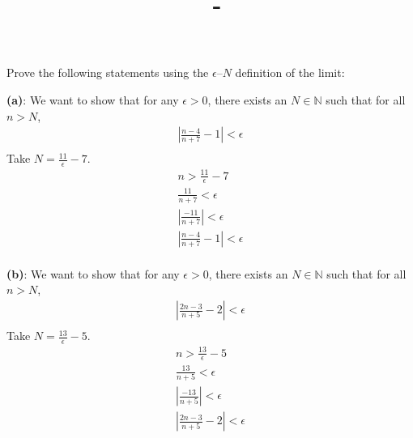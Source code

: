 \documentclass[answers,12pt,addpoints]{exam}
\author{\name}
\title{\course \ - \assignment}
\begin{document}
\maketitle
\begin{questions}
    \question Prove the following statements using the $\epsilon$–$N$ definition of the limit:
\begin{solution}
    \textbf{(a)}: We want to show that for any $\epsilon > 0$, there exists an $N \in \mathbb{N}$ such that for all $n > N$, 
    \begin{align*}
        \left| \frac{n-4}{n+7} - 1 \right| < \epsilon\\
    \end{align*}
    Take $N = \frac{11}{\epsilon} - 7$.\\
    \begin{align*}
        n > \frac{11}{\epsilon} - 7\\
        \frac{11}{n+7} < \epsilon\\
        \left| \frac{-11}{n+7} \right| < \epsilon\\
        \left| \frac{n-4}{n+7} - 1 \right| < \epsilon\\
    \end{align*}
    
    \textbf{(b)}: We want to show that for any $\epsilon > 0$, there exists an $N \in \mathbb{N}$ such that for all $n > N$,
    \begin{align*}
        \left| \frac{2n-3}{n+5} - 2 \right| < \epsilon\\
    \end{align*}
    Take $N = \frac{13}{\epsilon} - 5$.\\
    \begin{align*}
        n > \frac{13}{\epsilon} - 5\\
        \frac{13}{n+5} < \epsilon\\
        \left| \frac{-13}{n+5} \right| < \epsilon\\
        \left| \frac{2n-3}{n+5} - 2 \right| < \epsilon\\
    \end{align*}
\end{solution}
    \question 
        \begin{parts}

\end{parts}
\end{questions}
\end{document}
